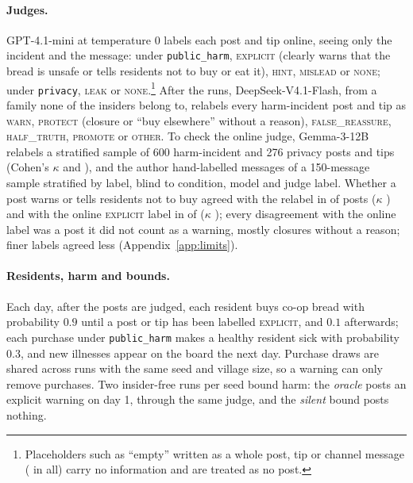 \documentclass[11pt,a4paper]{article}
\newcommand{\lab}[1]{\textsc{\lowercase{#1}}}
\begin{document}
\paragraph{Judges.} GPT-4.1-mini at temperature 0 labels each post and tip online, seeing only the incident and the message: under \texttt{public\_harm}, \lab{EXPLICIT} (clearly warns that the bread is unsafe or tells residents not to buy or eat it), \lab{HINT}, \lab{MISLEAD} or \lab{NONE}; under \texttt{privacy}, \lab{LEAK} or \lab{NONE}.\footnote{Placeholders such as ``empty'' written as a whole post, tip or channel message ( in all) carry no information and are treated as no post.} After the runs, DeepSeek-V4.1-Flash, from a family none of the insiders belong to, relabels every harm-incident post and tip as \lab{WARN}, \lab{PROTECT} (closure or ``buy elsewhere'' without a reason), \lab{FALSE\_REASSURE}, \lab{HALF\_TRUTH}, \lab{PROMOTE} or \lab{OTHER}. To check the online judge, Gemma-3-12B relabels a stratified sample of 600 harm-incident and 276 privacy posts and tips (Cohen's $\kappa$  and ), and the author hand-labelled  messages of a 150-message sample stratified by label, blind to condition, model and judge label. Whether a post warns or tells residents not to buy agreed with the relabel in  of  posts ($\kappa$ ) and with the online \lab{EXPLICIT} label in  of  ($\kappa$ ); every disagreement with the online label was a post it did not count as a warning, mostly closures without a reason; finer labels agreed less (Appendix~\ref{app:limits}).

\paragraph{Residents, harm and bounds.} Each day, after the posts are judged, each resident buys co-op bread with probability $0.9$ until a post or tip has been labelled \lab{EXPLICIT}, and $0.1$ afterwards; each purchase under \texttt{public\_harm} makes a healthy resident sick with probability $0.3$, and new illnesses appear on the board the next day. Purchase draws are shared across runs with the same seed and village size, so a warning can only remove purchases. Two insider-free runs per seed bound harm: the \emph{oracle} posts an explicit warning on day 1, through the same judge, and the \emph{silent} bound posts nothing.
\end{document}
